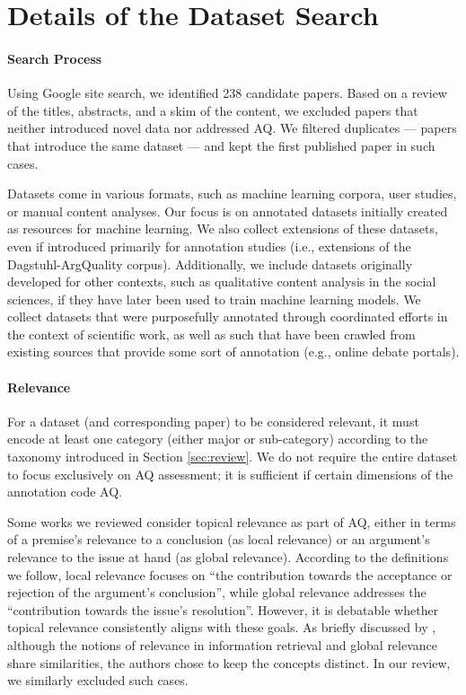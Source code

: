 \onecolumn
\newpage
\twocolumn

\section{Details of the Dataset Search}
\label{sec:review-details}

\paragraph{Search Process}
Using Google site search, we identified 238 candidate papers. Based on a review of the titles, abstracts, and a skim of the content, we excluded papers that neither introduced novel data nor addressed AQ. We filtered duplicates --- papers that introduce the same dataset --- and kept the first published paper in such cases.

Datasets come in various formats, such as machine learning corpora, user studies, or manual content analyses. Our focus is on annotated datasets initially created as resources for machine learning. We also collect extensions of these datasets, even if introduced primarily for annotation studies (i.e., extensions of the Dagstuhl-ArgQuality corpus). Additionally, we include datasets originally developed for other contexts, such as qualitative content analysis in the social sciences, if they have later been used to train machine learning models. We collect datasets that were purposefully annotated through coordinated efforts in the context of scientific work, as well as such that have been crawled from existing sources that provide some sort of annotation (e.g., online debate portals).

\paragraph{Relevance}
For a dataset (and corresponding paper) to be considered relevant, it must encode at least one category (either major or sub-category) according to the taxonomy introduced in Section \ref{sec:review}. We do not require the entire dataset to focus exclusively on AQ assessment; it is sufficient if certain dimensions of the annotation code AQ.

Some works we reviewed consider topical relevance as part of AQ, either in terms of a premise’s relevance to a conclusion (as local relevance) or an argument’s relevance to the issue at hand (as global relevance). According to the definitions we follow, local relevance focuses on ``the contribution towards the acceptance or rejection of the argument's conclusion'', while global relevance addresses the ``contribution towards the issue's resolution''. However, it is debatable whether topical relevance consistently aligns with these goals. As briefly discussed by \citet{potthast2019argument}, although the notions of relevance in information retrieval and global relevance share similarities, the authors chose to keep the concepts distinct. In our review, we similarly excluded such cases.


